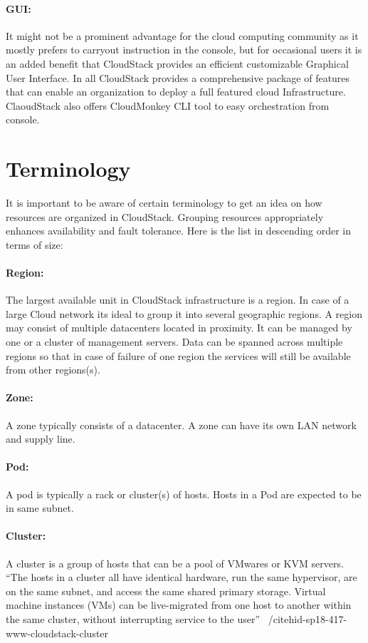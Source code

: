 \paragraph{GUI:} It might not be a prominent advantage for the cloud
computing community as it mostly prefers to carryout instruction in
the console, but for occasional users it is an added benefit that
CloudStack provides an efficient customizable Graphical User
Interface. In all CloudStack provides a comprehensive package of
features that can enable an organization to deploy a full featured
cloud Infrastructure. ClaoudStack also offers CloudMonkey CLI 
tool to easy orchestration from console.

\section{Terminology}

It is important to be aware of certain terminology to get an idea on
how resources are organized in CloudStack. Grouping resources 
appropriately enhances availability and fault tolerance. Here is the 
list in descending order in terms of size:
\paragraph{Region:}	The largest available unit in CloudStack infrastructure is a 
region. In case of a large Cloud network its ideal to group it into 
several geographic regions. A region may consist of multiple datacenters
located in proximity. It can be managed by one or a cluster of management
servers. Data can be spanned across multiple regions so that in case of
failure of one region the services will still be available from other regions(s).
\paragraph{Zone:}	A zone typically consists of a datacenter. A zone can have its own LAN
network and supply line. 
\paragraph{Pod:}	A pod is typically a rack or cluster(s) of hosts. Hosts in a Pod are 
expected to be in same subnet. 
\paragraph{Cluster:} 	A cluster is a group of hosts that can be a pool of VMwares or KVM 
servers. ``The hosts in a cluster all have identical hardware, run the same 
hypervisor, are on the same subnet, and access the same shared primary storage.
Virtual machine instances (VMs) can be live-migrated from one host to another
within the same cluster, without interrupting service to the user''
~/cite{hid-sp18-417-www-cloudstack-cluster}
